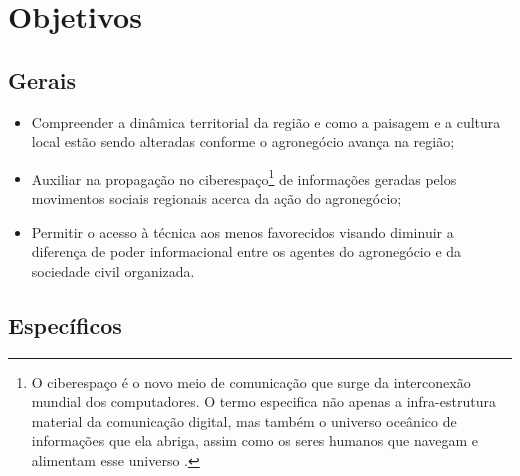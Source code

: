 \chapter{Objetivos}

\section{Gerais}

\begin{itemize}
 \item Compreender a dinâmica territorial da região e como a paisagem e a cultura local estão sendo alteradas conforme o agronegócio avança na região;
 \item Auxiliar na propagação no ciberespaço\footnote{O ciberespaço é o novo meio de comunicação que surge da interconexão mundial dos computadores. O termo especifica não apenas a infra-estrutura material da comunicação digital, mas também o universo oceânico de informações que ela abriga, assim como os seres humanos que navegam e alimentam esse universo \cite[p. 17]{levy}.} de informações geradas pelos movimentos sociais regionais acerca da ação do agronegócio;
 \item Permitir o acesso à técnica aos menos favorecidos visando diminuir a diferença de poder informacional entre os agentes do agronegócio e da sociedade civil organizada.
\end{itemize}

\section{Específicos}

